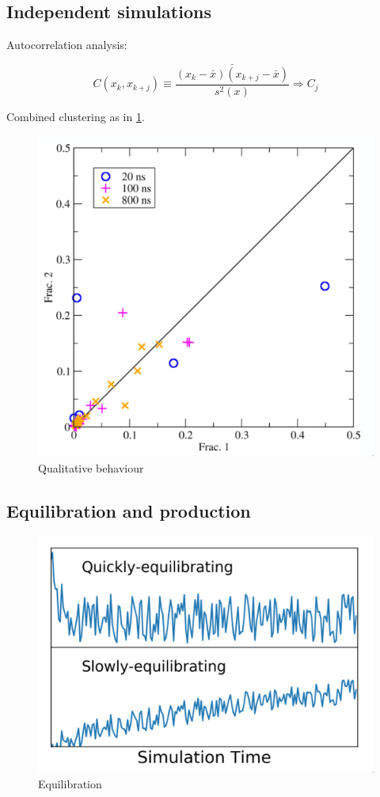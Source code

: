 	\subsection{Independent simulations}
	Autocorrelation analysis:

	$$C(x_k, x_{k+j}) \equiv\frac{\bar{(x_k-\bar{x})(x_{k+j}-\bar{x})}}{s^2(x)}\Rightarrow C_j$$

	Combined clustering as in \ref{fig:independent_simulation}.

	\begin{figure}[H]
		\includegraphics[width = \textwidth]{independent-simulations}
		\caption{Qualitative behaviour}
		\label{fig:independent_simulation}
	\end{figure}

	\subsection{Equilibration and production}

	\begin{figure}[H]
		\includegraphics[width = \textwidth]{equilibration}
		\caption{Equilibration}
		\label{fig:equilibration}
	\end{figure}

